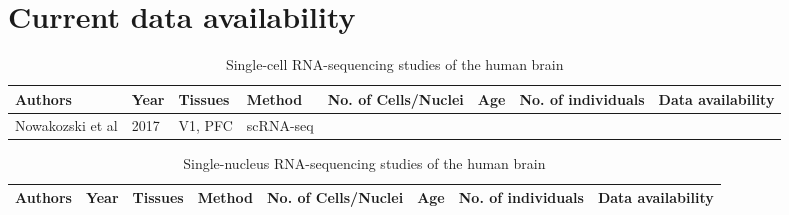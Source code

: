 \documentclass[12pt]{article}
\begin{document}
\section{Current data availability}

\begin{landscape}
	\begin{table}[!htp]
		\centering
		\footnotesize
		\caption{Single-cell RNA-sequencing studies of the human brain}
		\begin{tabular}{|l|l|l|l|l|l|l|l|}
			\hline
			\textbf{Authors} &\textbf{Year}  & \textbf{Tissues} & \textbf{Method} & \textbf{No. of Cells/Nuclei}  & \textbf{Age} &  \textbf{No. of individuals} & \textbf{Data availability}  \\ \hline
			Nowakozski et al & 2017 &V1, PFC & scRNA-seq     & &&& \\ \hline
		\end{tabular}
	\end{table}
\end{landscape}



\begin{landscape}
	\begin{table}[!htp]
		\centering
		\footnotesize
		\caption{Single-nucleus RNA-sequencing studies of the human brain}
		\begin{tabular}{|l|l|l|l|l|l|l|l|}
			\hline
			\textbf{Authors} &\textbf{Year}  & \textbf{Tissues} & \textbf{Method} & \textbf{No. of Cells/Nuclei}  & \textbf{Age} &  \textbf{No. of individuals} & \textbf{Data availability}  \\ \hline
		\end{tabular}
	\end{table}
\end{landscape}
\end{document}
